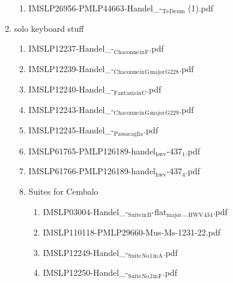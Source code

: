 \documentclass[11pt]{article}
\begin{document}
\begin{enumerate}
\begin{enumerate}
\item IMSLP26956-PMLP44663-Handel\_-$_{\text{Te}}$$_{\text{Deum}}$ (1).pdf
\label{sec-1-1-1-1-44-37-4-2}
\end{enumerate}

\item solo keyboard stuff
\label{sec-1-1-1-1-44-37-5}
\begin{enumerate}
\item IMSLP12237-Handel\_-$_{\text{Chaconne}}$$_{\text{in}}$$_{\text{F}}$.pdf
\label{sec-1-1-1-1-44-37-5-1}

\item IMSLP12239-Handel\_-$_{\text{Chaconne}}$$_{\text{in}}$$_{\text{G}}$$_{\text{major}}$$_{\text{G228}}$.pdf
\label{sec-1-1-1-1-44-37-5-2}

\item IMSLP12240-Handel\_-$_{\text{Fantasia}}$$_{\text{in}}$$_{\text{C}}$.pdf
\label{sec-1-1-1-1-44-37-5-3}

\item IMSLP12243-Handel\_-$_{\text{Chaconne}}$$_{\text{in}}$$_{\text{G}}$$_{\text{major}}$$_{\text{G229}}$.pdf
\label{sec-1-1-1-1-44-37-5-4}

\item IMSLP12245-Handel\_-$_{\text{Passacaglia}}$.pdf
\label{sec-1-1-1-1-44-37-5-5}

\item IMSLP61765-PMLP126189-handel$_{\text{hwv}}$-437$_{\text{1}}$.pdf
\label{sec-1-1-1-1-44-37-5-6}

\item IMSLP61766-PMLP126189-handel$_{\text{hwv}}$-437$_{\text{4}}$.pdf
\label{sec-1-1-1-1-44-37-5-7}

\item Suites for Cembalo
\label{sec-1-1-1-1-44-37-5-8}
\begin{enumerate}
\item IMSLP03004-Handel\_-$_{\text{Suite}}$$_{\text{in}}$$_{\text{B}}$-flat$_{\text{major}}$\_$_{\text{HWV}}$$_{\text{434}}$.pdf
\label{sec-1-1-1-1-44-37-5-8-1}

\item IMSLP110118-PMLP29660-Mus-Ms-1231-22.pdf
\label{sec-1-1-1-1-44-37-5-8-2}

\item IMSLP12249-Handel\_-$_{\text{Suite}}$$_{\text{No}}$$_{\text{1}}$$_{\text{in}}$$_{\text{A}}$.pdf
\label{sec-1-1-1-1-44-37-5-8-3}

\item IMSLP12250-Handel\_-$_{\text{Suite}}$$_{\text{No}}$$_{\text{2}}$$_{\text{in}}$$_{\text{F}}$.pdf
\label{sec-1-1-1-1-44-37-5-8-4}


\end{enumerate}
\end{enumerate}
\end{enumerate}
\end{document}
